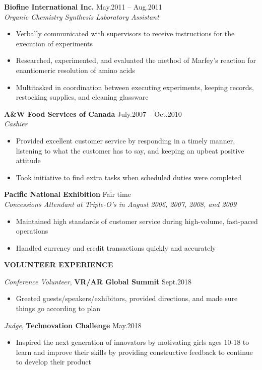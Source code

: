 \documentclass{res}
\renewcommand{\section}[1]{%
  \vspace{0.3in}%
  \centerline{\uppercase{\bf{#1}}}%
  \vspace{-6pt}}
\newcommand{\linehead}[2]{%
  {\bf #1} \hfill #2\\}
\newcommand{\linetitle}[1]{%
  {\sl #1}}
\newcommand{\linevolunteer}[3]{%
  {\sl #3}, {\bf #2} \hfill #1}%
\begin{document}
\begin{resume}
\pagebreak

\linehead{Biofine International Inc.}{May.2011 -- Aug.2011}
\linetitle{Organic Chemistry Synthesis Laboratory Assistant}
\begin{itemize}
  \item Verbally communicated with supervisors to receive instructions for the execution of experiments
  \item Researched, experimented, and evaluated the method of Marfey's reaction for enantiomeric resolution of amino acids
  \item Multitasked in coordination between executing experiments, keeping records, restocking supplies, and cleaning glassware
\end{itemize}

\linehead{A\&W Food Services of Canada}{July.2007 -- Oct.2010}
\linetitle{Cashier}
\begin{itemize}
  \item Provided excellent customer service by responding in a timely manner, listening to what the customer has to say, and keeping an upbeat positive attitude
  \item Took initiative to find extra tasks when scheduled duties were completed
\end{itemize}

\linehead{Pacific National Exhibition}{Fair time}
\linetitle{Concessions Attendant at Triple-O's in August 2006, 2007, 2008, and 2009}
\begin{itemize}
  \item Maintained high standards of customer service during high-volume, fast-paced operations
  \item Handled currency and credit transactions quickly and accurately
\end{itemize}

\section{Volunteer experience}

\linevolunteer{Sept.2018}{%
  VR/AR Global Summit}{%
  Conference Volunteer}
\begin{itemize}
  \item Greeted guests/speakers/exhibitors, provided directions, and made sure things go according to plan
\end{itemize}

\linevolunteer{May.2018}{%
  Technovation Challenge}{%
  Judge}
\begin{itemize}
  \item Inspired the next generation of innovators by motivating girls ages 10-18 to learn and improve their skills by providing constructive feedback to continue to develop their product
\end{itemize}


\end{resume}
\end{document}
